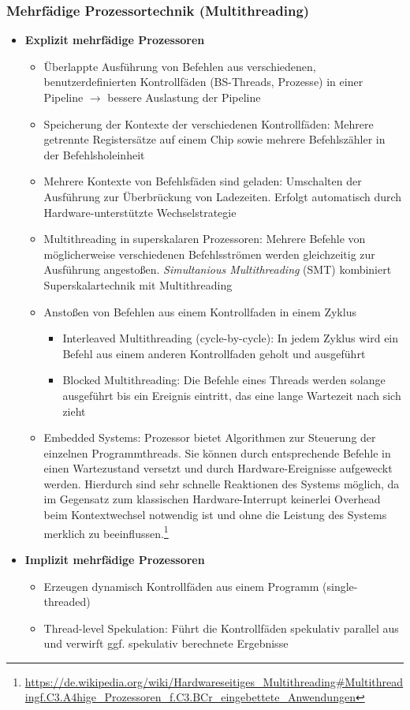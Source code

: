 \subsubsection{Mehrfädige Prozessortechnik (Multithreading)}
\begin{itemize}
	\item \textbf{Explizit mehrfädige Prozessoren}
	\begin{itemize}
		\item Überlappte Ausführung von Befehlen aus verschiedenen, benutzerdefinierten Kontrollfäden (BS-Threads, Prozesse) in einer Pipeline \(\rightarrow\) bessere Auslastung der Pipeline
		\item Speicherung der Kontexte der verschiedenen Kontrollfäden: Mehrere getrennte Registersätze auf einem Chip sowie mehrere Befehlszähler in der Befehlsholeinheit
		\item Mehrere Kontexte von Befehlsfäden sind geladen: Umschalten der Ausführung zur Überbrückung von Ladezeiten. Erfolgt automatisch durch Hardware-unterstützte Wechselstrategie
		\item Multithreading in superskalaren Prozessoren: Mehrere Befehle von möglicherweise verschiedenen Befehlsströmen werden gleichzeitig zur Ausführung angestoßen. \textit{Simultanious Multithreading} (SMT) kombiniert Superskalartechnik mit Multithreading
		\item Anstoßen von Befehlen aus einem Kontrollfaden in einem Zyklus
		\begin{itemize}
			\item Interleaved Multithreading (cycle-by-cycle): In jedem Zyklus wird ein Befehl aus einem anderen Kontrollfaden geholt und ausgeführt
			\item Blocked Multithreading: Die Befehle eines Threads werden solange ausgeführt bis ein Ereignis eintritt, das eine lange Wartezeit nach sich zieht
		\end{itemize}
		\item Embedded Systems: Prozessor bietet Algorithmen zur Steuerung der einzelnen Programmthreads. Sie können durch entsprechende Befehle in einen Wartezustand versetzt und durch Hardware-Ereignisse aufgeweckt werden. Hierdurch sind sehr schnelle Reaktionen des Systems möglich, da im Gegensatz zum klassischen Hardware-Interrupt keinerlei Overhead beim Kontextwechsel notwendig ist und ohne die Leistung des Systems merklich zu beeinflussen.\footnote{\url{https://de.wikipedia.org/wiki/Hardwareseitiges_Multithreading\#Multithreadingf.C3.A4hige_Prozessoren_f.C3.BCr_eingebettete_Anwendungen}}
	\end{itemize}
	\item \textbf{Implizit mehrfädige Prozessoren} %
	\begin{itemize}
		\item Erzeugen dynamisch Kontrollfäden aus einem Programm (single-threaded)
		\item Thread-level Spekulation: Führt die Kontrollfäden spekulativ parallel aus und verwirft ggf. spekulativ berechnete Ergebnisse
	\end{itemize}
\end{itemize}


